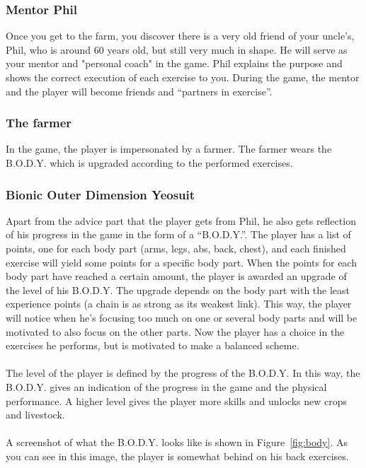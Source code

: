\subsubsection{Mentor Phil}
Once you get to the farm, you discover there is a very old friend of your uncle's, Phil, who is around 60 years old, but still very much in shape. He will serve as your mentor and "personal coach" in the game. Phil explains the purpose and shows the correct execution of each exercise to you. During the game, the mentor and the player will become friends and ``partners in exercise''.

\subsubsection{The farmer}
In the game, the player is impersonated by a farmer. The farmer wears the B.O.D.Y. which is upgraded according to the performed exercises.

\subsubsection{Bionic Outer Dimension Yeosuit}
Apart from the advice part that the player gets from Phil, he also gets reflection of his progress in the game in the form of a ``B.O.D.Y.''. The player has a list of points, one for each body part (arms, legs, abs, back, chest), and each finished exercise will yield some points for a specific body part. When the points for each body part have reached a certain amount, the player is awarded an upgrade of the level of his B.O.D.Y. The upgrade depends on the body part with the least experience points (a chain is as strong as its weakest link). This way, the player will notice when he's focusing too much on one or several body parts and will be motivated to also focus on the other parts. Now the player has a choice in the exercises he performs, but is motivated to make a balanced scheme. 
\\\\
The level of the player is defined by the progress of the B.O.D.Y. In this way, the B.O.D.Y. gives an indication of the progress in the game and the physical performance.  A higher level gives the player more skills and unlocks new crops and livestock.
\\\\
A screenshot of what the B.O.D.Y. looks like is shown in Figure~\ref{fig:body}. As you can see in this image, the player is somewhat behind on his back exercises.

